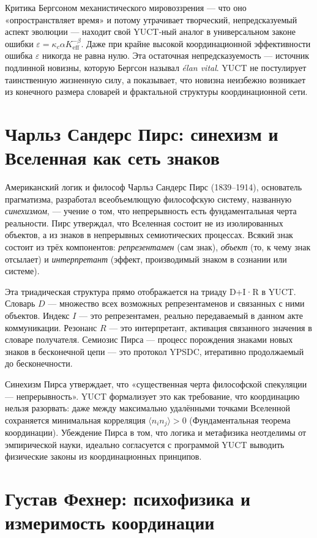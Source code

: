 \documentclass[12pt,a4paper]{article}
\begin{document}
	Критика Бергсоном механистического мировоззрения — что оно «опространствляет время» и потому утрачивает творческий, непредсказуемый аспект эволюции — находит свой YUCT‑ный аналог в универсальном законе ошибки \(\varepsilon = \kappa_c \alpha K_{\mathrm{eff}}^{-\beta}\). Даже при крайне высокой координационной эффективности ошибка \(\varepsilon\) никогда не равна нулю. Эта остаточная непредсказуемость — источник подлинной новизны, которую Бергсон называл \emph{élan vital}. YUCT не постулирует таинственную жизненную силу, а показывает, что новизна неизбежно возникает из конечного размера словарей и фрактальной структуры координационной сети.
	
	\section{Чарльз Сандерс Пирс: синехизм и Вселенная как сеть знаков}
	
	Американский логик и философ Чарльз Сандерс Пирс (1839–1914), основатель прагматизма, разработал всеобъемлющую философскую систему, названную \emph{синехизмом}, — учение о том, что непрерывность есть фундаментальная черта реальности. Пирс утверждал, что Вселенная состоит не из изолированных объектов, а из знаков в непрерывных семиотических процессах. Всякий знак состоит из трёх компонентов: \emph{репрезентамен} (сам знак), \emph{объект} (то, к чему знак отсылает) и \emph{интерпретант} (эффект, производимый знаком в сознании или системе).
	
	Эта триадическая структура прямо отображается на триаду D+I·R в YUCT. Словарь \(D\) — множество всех возможных репрезентаменов и связанных с ними объектов. Индекс \(I\) — это репрезентамен, реально передаваемый в данном акте коммуникации. Резонанс \(R\) — это интерпретант, активация связанного значения в словаре получателя. Семиозис Пирса — процесс порождения знаками новых знаков в бесконечной цепи — это протокол YPSDC, итеративно продолжаемый до бесконечности.
	
	Синехизм Пирса утверждает, что «существенная черта философской спекуляции — непрерывность». YUCT формализует это как требование, что координацию нельзя разорвать: даже между максимально удалёнными точками Вселенной сохраняется минимальная корреляция \(\langle n_i n_j \rangle > 0\) (Фундаментальная теорема координации). Убеждение Пирса в том, что логика и метафизика неотделимы от эмпирической науки, идеально согласуется с программой YUCT выводить физические законы из координационных принципов.
	
	\section{Густав Фехнер: психофизика и измеримость координации}
	
\end{document}
